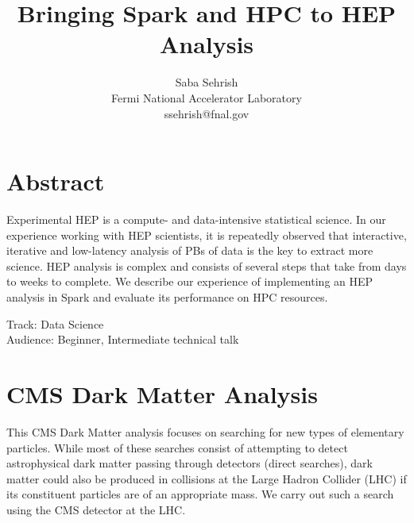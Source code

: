\documentclass[11pt, twocolumn]{article}
\newcommand{\squeezeup}{\vspace{-5.5mm}}
\begin{document}
\title{Bringing Spark and HPC to HEP Analysis}
\author{Saba Sehrish \\ Fermi National Accelerator Laboratory \\ ssehrish@fnal.gov}
\date{}
\maketitle

\thispagestyle{empty}

\section*{Abstract}
\squeezeup
Experimental HEP is a compute- and data-intensive statistical science. 
In our experience working with HEP scientists, it is repeatedly observed 
that interactive, iterative and low-latency analysis of PBs of data is the 
key to extract more science. HEP analysis is complex and consists of 
several steps that take from days to weeks to complete. We describe 
our experience of implementing an HEP analysis in Spark 
and evaluate its performance on HPC resources.

Track: Data Science  \\
Audience: Beginner, Intermediate technical talk \\
\squeezeup

\section{CMS Dark Matter Analysis}
This CMS Dark Matter analysis focuses on searching for new types of 
elementary particles. 
While most of these searches consist of attempting to detect astrophysical 
dark matter passing through detectors (direct searches), dark matter could 
also be produced in collisions at the Large Hadron Collider (LHC) if its 
constituent particles are of an appropriate mass. We carry out such a 
search using the CMS detector at the LHC. 
\end{document}
